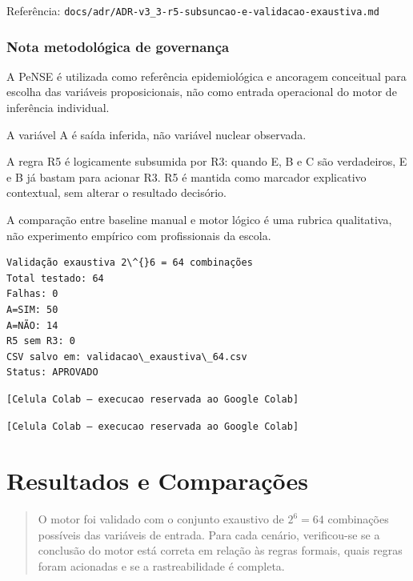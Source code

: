 \documentclass[11pt]{article}
\begin{document}
Referência:
\texttt{docs/adr/ADR-v3\_3-r5-subsuncao-e-validacao-exaustiva.md}

    \subsubsection{Nota metodológica de
governança}\label{nota-metodoluxf3gica-de-governanuxe7a}

A PeNSE é utilizada como referência epidemiológica e ancoragem
conceitual para escolha das variáveis proposicionais, não como entrada
operacional do motor de inferência individual.

A variável A é saída inferida, não variável nuclear observada.

A regra R5 é logicamente subsumida por R3: quando E, B e C são
verdadeiros, E e B já bastam para acionar R3. R5 é mantida como marcador
explicativo contextual, sem alterar o resultado decisório.

A comparação entre baseline manual e motor lógico é uma rubrica
qualitativa, não experimento empírico com profissionais da escola.

    \begin{Verbatim}[commandchars=\\\{\}]
Validação exaustiva 2\^{}6 = 64 combinações
Total testado: 64
Falhas: 0
A=SIM: 50
A=NÃO: 14
R5 sem R3: 0
CSV salvo em: validacao\_exaustiva\_64.csv
Status: APROVADO
    \end{Verbatim}

    \begin{Verbatim}[commandchars=\\\{\}]
[Celula Colab — execucao reservada ao Google Colab]
    \end{Verbatim}

    \begin{Verbatim}[commandchars=\\\{\}]
[Celula Colab — execucao reservada ao Google Colab]
    \end{Verbatim}

    \section{Resultados e Comparações}\label{resultados-e-comparauxe7uxf5es}

\begin{quote}
O motor foi validado com o conjunto exaustivo de \(2^6 = 64\)
combinações possíveis das variáveis de entrada. Para cada cenário,
verificou-se se a conclusão do motor está correta em relação às regras
formais, quais regras foram acionadas e se a rastreabilidade é completa.
\end{quote}
\end{document}
